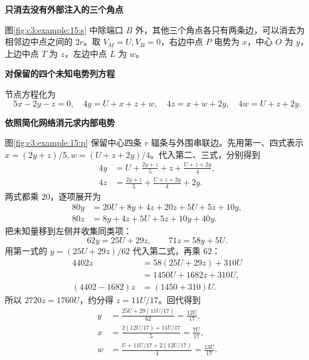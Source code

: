 \begin{solution}\textbf{只消去没有外部注入的三个角点}\par\nobreak
图\ref{fig:c3:example:15:s} 中除端口 $B$ 外，其他三个角点各只有两条边，可以消去为相邻边中点之间的 $2r$。取 $V_M=U,V_B=0$，右边中点 $P$ 电势为 $x$，中心 $O$ 为 $y$，上边中点 $T$ 为 $z$，左边中点 $L$ 为 $w$。

\par\medskip{}\noindent\textbf{对保留的四个未知电势列方程}\par\nobreak
节点方程化为
\[
 5x-2y-z=0,\quad4y=U+x+z+w,\quad4z=x+w+2y,\quad4w=U+z+2y.
\]



\par\medskip{}\noindent\textbf{依照简化网络消元求内部电势}\par\nobreak
图\ref{fig:c3:example:15:p} 保留中心四条 $r$ 辐条与外围串联边。先用第一、四式表示 $x=(2y+z)/5,w=(U+z+2y)/4$。代入第二、三式，分别得到
\[
 \begin{aligned}
 4y&=U+\frac{2y+z}{5}+z+\frac{U+z+2y}{4},\\
 4z&=\frac{2y+z}{5}+\frac{U+z+2y}{4}+2y.
 \end{aligned}
\]
两式都乘 $20$，逐项展开为
\[
 \begin{aligned}
 80y&=20U+8y+4z+20z+5U+5z+10y,\\
 80z&=8y+4z+5U+5z+10y+40y.
 \end{aligned}
\]
把未知量移到左侧并收集同类项：
\[
 62y=25U+29z,\qquad71z=58y+5U.
\]
用第一式的 $y=(25U+29z)/62$ 代入第二式，再乘 $62$：
\[
 \begin{aligned}
 4402z&=58(25U+29z)+310U\\
 &=1450U+1682z+310U,\\
 (4402-1682)z&=(1450+310)U.
 \end{aligned}
\]
所以 $2720z=1760U$，约分得 $z=11U/17$。回代得到
\[
 \begin{aligned}
 y&=\frac{25U+29(11U/17)}{62}=\frac{12U}{17},\\
 x&=\frac{2(12U/17)+11U/17}{5}=\frac{7U}{17},\\
 w&=\frac{U+11U/17+2(12U/17)}4=\frac{13U}{17}.
 \end{aligned}
\]


\end{solution}

